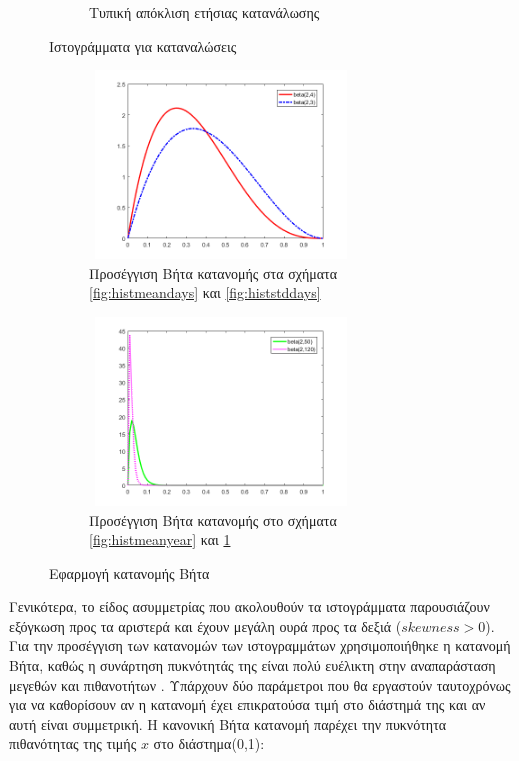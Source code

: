 \begin{figure}
\begin{subfigure}[b]{0.5\textwidth}
	\caption{Τυπική απόκλιση ετήσιας κατανάλωσης}
	\label{fig:histstdyear}
	\end{subfigure}
	\caption{Ιστογράμματα για καταναλώσεις}
	\label{fig:histograms}
\end{figure}

\begin{figure}
 \begin{subfigure}[b]{0.5\textwidth}
 \includegraphics[width=70mm, height=50mm]{../../plots/Consumption_Analysis/beta_days_plot.png}
\caption{Προσέγγιση Βήτα κατανομής στα σχήματα \ref{fig:histmeandays} και \ref{fig:histstddays}}
\label{fig:betadays}
 \end{subfigure}
 \quad
 \begin{subfigure}[b]{0.5\textwidth}
 \includegraphics[width=70mm, height=50mm]{../../plots/Consumption_Analysis/beta_year_plot.png}
\caption{Προσέγγιση Βήτα κατανομής στο σχήματα \ref{fig:histmeanyear} και \ref{fig:histstdyear}}
\label{fig:betadays}
 \end{subfigure}
	\caption{Εφαρμογή κατανομής Βήτα}
	\label{fig:betapdfs}
	\end{figure}
\newpage
Γενικότερα, το είδος ασυμμετρίας που ακολουθούν τα ιστογράμματα παρουσιάζουν εξόγκωση προς τα αριστερά και έχουν μεγάλη ουρά προς τα δεξιά ($skewness>0$). Για την προσέγγιση των κατανομών των ιστογραμμάτων χρησιμοποιήθηκε η κατανομή Βήτα, καθώς η συνάρτηση πυκνότητάς της είναι πολύ ευέλικτη στην αναπαράσταση μεγεθών και πιθανοτήτων \cite{betadstr}. Υπάρχουν δύο παράμετροι που θα εργαστούν ταυτοχρόνως για να καθορίσουν αν η κατανομή έχει επικρατούσα τιμή στο διάστημά της και αν αυτή είναι συμμετρική. Η κανονική Βήτα κατανομή παρέχει την πυκνότητα πιθανότητας της τιμής $x$ στο διάστημα(0,1):
